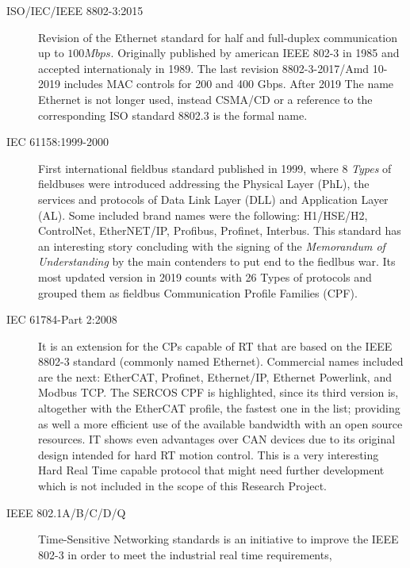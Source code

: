 \begin{description}
    \item[ISO/IEC/IEEE 8802-3:2015] Revision of the Ethernet standard for half and full-duplex communication up to $100Mbps$. Originally
        published by american IEEE 802-3 in 1985 and accepted internationaly in 1989. The last revision 8802-3-2017/Amd 10-2019 includes
        MAC controls for 200 and 400 Gbps.\cite{iso8802_ethernet} %
        After 2019 The name Ethernet is not longer used, instead CSMA/CD or a reference to the corresponding ISO standard 8802.3 is the formal name.
    \item[IEC 61158:1999-2000] First international fieldbus standard published in 1999, where 8 \emph{Types} of fieldbuses were introduced addressing the 
        Physical Layer (PhL), the services and protocols of Data Link Layer (DLL) and Application Layer (AL). Some included brand 
        names were the following: H1/HSE/H2, ControlNet, EtherNET/IP, Profibus, Profinet, Interbus. This standard has an interesting story
        concluding with the signing of the \emph{Memorandum of Understanding} by the main contenders to put end to the fiedlbus war.\cite{fieldbus_history} %
        Its most updated version in 2019 counts with 26 Types of protocols and grouped them as fieldbus Communication Profile Families (CPF). 
    \item[IEC 61784-Part 2:2008] It is an extension for the CPs capable of RT that are based on the IEEE 8802-3 standard (commonly named Ethernet). Commercial names included 
        are the next: EtherCAT, Profinet, Ethernet/IP, Ethernet Powerlink, and Modbus TCP.\cite{future_iiot} %
        The SERCOS CPF is highlighted, since its third version is, altogether with the EtherCAT profile, the fastest one in the list; providing as well
        a more efficient use of the available bandwidth with an open source resources. IT shows even advantages over CAN devices due
        to its original design intended for hard RT motion control.\cite{sercos_origin}\cite{sercos_performance} %
        This is a very interesting Hard Real Time capable protocol that might need further development which is not included in the scope of this 
        Research Project.
    \item[IEEE 802.1A/B/C/D/Q] Time-Sensitive Networking standards is an initiative to improve the IEEE 802-3 in order to meet the industrial real time requirements, 

\end{description}
